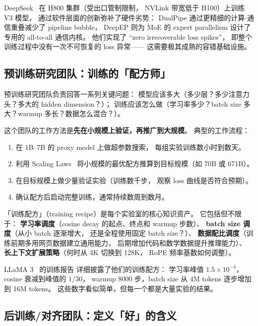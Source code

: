 \begin{corebox}
DeepSeek~\cite{deepseekv3} 在 H800 集群（受出口管制限制，
NVLink 带宽低于 H100）上训练 V3 模型，
通过软件层面的创新弥补了硬件劣势：
DualPipe 通过更精细的计算-通信重叠减少了 pipeline bubble，
DeepEP 则为 MoE 的 expert parallelism
设计了专用的 all-to-all 通信内核。
他们实现了 ``zero irrecoverable loss spikes''，
即整个训练过程中没有一次不可恢复的 loss 异常——
这需要极其成熟的容错基础设施。
\end{corebox}

\subsection{预训练研究团队：训练的「配方师」}

预训练研究团队负责回答一系列关键问题：
模型应该多大（多少层？多少注意力头？多大的 hidden dimension？）；
训练应该怎么做（学习率多少？batch size 多大？warmup 多长？数据怎么混合？）。

这个团队的工作方法是\textbf{先在小规模上验证，再推广到大规模}。
典型的工作流程：

\begin{enumerate}[noitemsep]
  \item 在 1B--7B 的 proxy model 上做超参数搜索，
        每组实验训练数小时到数天。
  \item 利用 Scaling Laws~\cite{kaplan2020scaling,hoffmann2022chinchilla}
        将小规模的最优配方推算到目标规模（如 70B 或 671B）。
  \item 在目标规模上做少量验证实验（训练数千步，
        观察 loss 曲线是否符合预期）。
  \item 确认配方后启动完整训练，通常持续数周到数月。
\end{enumerate}

「训练配方」（training recipe）是每个实验室的核心知识资产。
它包括但不限于：
\textbf{学习率调度}（cosine decay 的起点、终点和 warmup 步数）、
\textbf{batch size 调度}（从小 batch 逐渐增大，
还是全程使用固定 batch size？）、
\textbf{数据配比调度}（训练前期多用网页数据建立通用能力，
后期增加代码和数学数据提升推理能力）、
\textbf{长上下文扩展策略}（何时从 4K 切换到 128K，
RoPE 频率基数如何调整）。

LLaMA 3~\cite{dubey2024llama3} 的训练报告
详细披露了他们的训练配方：
学习率峰值 $1.5 \times 10^{-4}$，
cosine 衰减到峰值的 $1/30$，
warmup 8000 步，batch size 从 4M tokens 逐步增加到 16M tokens。
这些数字看似简单，但每一个都是大量实验的结果。

\subsection{后训练/对齐团队：定义「好」的含义}

